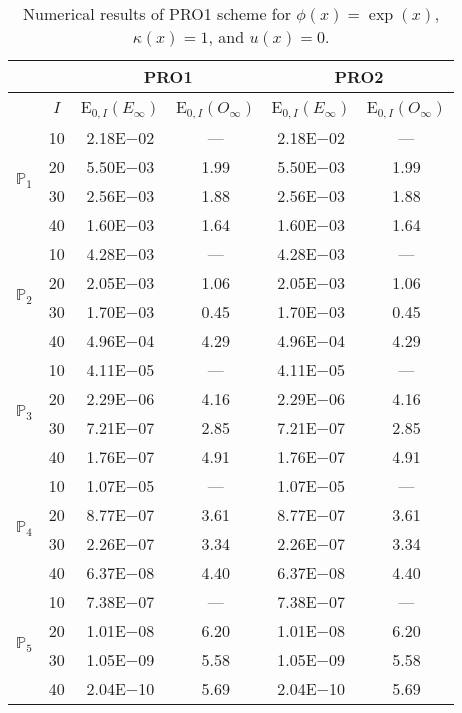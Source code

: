 \begin{table}[H]
\caption{Numerical results of PRO1 scheme for $\phi(x)=\exp(x)$, $\kappa(x)=1$, and $u(x)=0$.}
\setlength{\tabcolsep}{5pt}
\centering
\begin{tabular}{@{}l c c c c c@{}}
\toprule
 &  & \multicolumn{2}{c}{PRO1} & \multicolumn{2}{c}{PRO2}\\
\midrule
 & $I$ & E$_{0,I}(E_{\infty})$ & E$_{0,I}(O_{\infty})$ & E$_{0,I}(E_{\infty})$ & E$_{0,I}(O_{\infty})$\\
\midrule
\multirow{4}{*}{$\mathbb{P}_{1}$}
 & 10 & 2.18E$-$02 & --- & 2.18E$-$02 & ---\\
 & 20 & 5.50E$-$03 & 1.99 & 5.50E$-$03 & 1.99 \\
 & 30 & 2.56E$-$03 & 1.88 & 2.56E$-$03 & 1.88 \\
 & 40 & 1.60E$-$03 & 1.64 & 1.60E$-$03 & 1.64 \\
\midrule
\multirow{4}{*}{$\mathbb{P}_{2}$}
 & 10 & 4.28E$-$03 & --- & 4.28E$-$03 & ---\\
 & 20 & 2.05E$-$03 & 1.06 & 2.05E$-$03 & 1.06 \\
 & 30 & 1.70E$-$03 & 0.45 & 1.70E$-$03 & 0.45 \\
 & 40 & 4.96E$-$04 & 4.29 & 4.96E$-$04 & 4.29 \\
\midrule
\multirow{4}{*}{$\mathbb{P}_{3}$}
 & 10 & 4.11E$-$05 & --- & 4.11E$-$05 & ---\\
 & 20 & 2.29E$-$06 & 4.16 & 2.29E$-$06 & 4.16 \\
 & 30 & 7.21E$-$07 & 2.85 & 7.21E$-$07 & 2.85 \\
 & 40 & 1.76E$-$07 & 4.91 & 1.76E$-$07 & 4.91 \\
\midrule
\multirow{4}{*}{$\mathbb{P}_{4}$}
 & 10 & 1.07E$-$05 & --- & 1.07E$-$05 & ---\\
 & 20 & 8.77E$-$07 & 3.61 & 8.77E$-$07 & 3.61 \\
 & 30 & 2.26E$-$07 & 3.34 & 2.26E$-$07 & 3.34 \\
 & 40 & 6.37E$-$08 & 4.40 & 6.37E$-$08 & 4.40 \\
\midrule
\multirow{4}{*}{$\mathbb{P}_{5}$}
 & 10 & 7.38E$-$07 & --- & 7.38E$-$07 & ---\\
 & 20 & 1.01E$-$08 & 6.20 & 1.01E$-$08 & 6.20 \\
 & 30 & 1.05E$-$09 & 5.58 & 1.05E$-$09 & 5.58 \\
 & 40 & 2.04E$-$10 & 5.69 & 2.04E$-$10 & 5.69 \\
\bottomrule
\end{tabular}
\label{Table:PRO:Test1}
\end{table}
